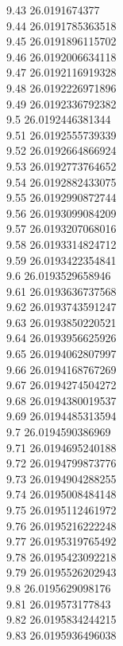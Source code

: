 {9.43	26.0191674377\\
9.44	26.0191785363518\\
9.45	26.0191896115702\\
9.46	26.0192006634118\\
9.47	26.0192116919328\\
9.48	26.0192226971896\\
9.49	26.0192336792382\\
9.5	26.0192446381344\\
9.51	26.0192555739339\\
9.52	26.0192664866924\\
9.53	26.0192773764652\\
9.54	26.0192882433075\\
9.55	26.0192990872744\\
9.56	26.0193099084209\\
9.57	26.0193207068016\\
9.58	26.0193314824712\\
9.59	26.0193422354841\\
9.6	26.0193529658946\\
9.61	26.0193636737568\\
9.62	26.0193743591247\\
9.63	26.0193850220521\\
9.64	26.0193956625926\\
9.65	26.0194062807997\\
9.66	26.0194168767269\\
9.67	26.0194274504272\\
9.68	26.0194380019537\\
9.69	26.0194485313594\\
9.7	26.0194590386969\\
9.71	26.0194695240188\\
9.72	26.0194799873776\\
9.73	26.0194904288255\\
9.74	26.0195008484148\\
9.75	26.0195112461972\\
9.76	26.0195216222248\\
9.77	26.0195319765492\\
9.78	26.0195423092218\\
9.79	26.0195526202943\\
9.8	26.0195629098176\\
9.81	26.019573177843\\
9.82	26.0195834244215\\
9.83	26.0195936496038\\
}
